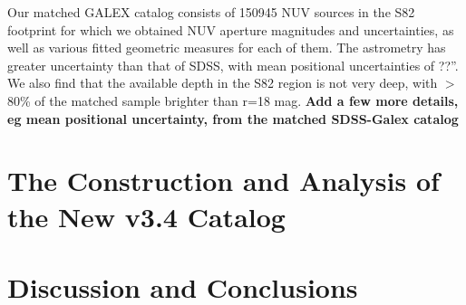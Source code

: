\documentclass{aastex63}
\begin{document}
Our matched GALEX catalog consists of 150945 NUV sources in the S82 footprint for which we obtained NUV aperture magnitudes and uncertainties, as well as various fitted geometric measures for each of them. The astrometry has greater uncertainty than that of SDSS, with mean positional uncertainties of ??''. We also find that the available depth in the S82 region is not very deep, with $>$80\% of the matched sample brighter than r=18 mag. {\bf Add a few more details, eg mean positional uncertainty, from the matched SDSS-Galex catalog}
  

 

 
 
\section{The Construction and Analysis of the New v3.4 Catalog \label{sec:v34}}

\section{Discussion and Conclusions} \label{sec:disc}
\end{document}

